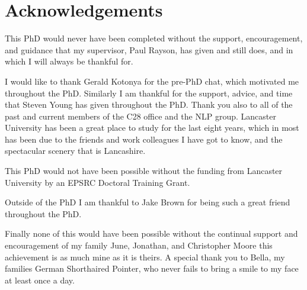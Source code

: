 \section*{\centering Acknowledgements}


This PhD would never have been completed without the support, encouragement, and guidance that my supervisor, Paul Rayson, has given and still does, and in which I will always be thankful for.

I would like to thank Gerald Kotonya for the pre-PhD chat, which motivated me throughout the PhD. Similarly I am thankful for the support, advice, and time that Steven Young has given throughout the PhD. Thank you also to all of the past and current members of the C28 office and the NLP group. Lancaster University has been a great place to study for the last eight years, which in most has been due to the friends and work colleagues I have got to know, and the spectacular scenery that is Lancashire.

This PhD would not have been possible without the funding from Lancaster University by an EPSRC Doctoral Training Grant.

Outside of the PhD I am thankful to Jake Brown for being such a great friend throughout the PhD.

Finally none of this would have been possible without the continual support and encouragement of my family June, Jonathan, and Christopher Moore this achievement is as much mine as it is theirs. A special thank you to Bella, my families German Shorthaired Pointer, who never fails to bring a smile to my face at least once a day.